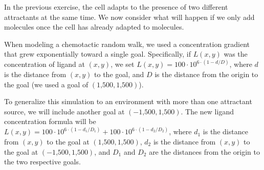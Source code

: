 \begin{exercise}\end{exercise}

In the previous exercise, the cell adapts to the presence of two different attractants at the same time. We now consider what will happen if we only add  molecules once the cell has already adapted to  molecules.\\

\begin{exercise}\end{exercise}

When modeling a chemotactic random walk, we used a concentration gradient that grew exponentially toward a single goal. Specifically, if $L(x,y)$ was the concentration of ligand at $(x, y)$, we set $L(x,y) = 100 \cdot 10^{6 \cdot (1-d/D)}$, where $d$ is the distance from $(x,y)$ to the goal, and $D$ is the distance from the origin to the goal (we used a goal of $(\text{1,500}, \text{1,500})$).

To generalize this simulation to an environment with more than one attractant source, we will include another goal at $(-\text{1,500}, \text{1,500})$. The new ligand concentration formula will be $L(x, y) = 100 \cdot 10^{6 \cdot (1-d_1/D_1)} + 100 \cdot 10^{6 \cdot (1-d_2/D_2)}$, where $d_1$ is the distance from $(x, y)$ to the goal at $(\text{1,500}, \text{1,500})$, $d_2$ is the distance from $(x, y)$ to the goal at $(-\text{1,500}, \text{1,500})$, and $D_1$ and $D_2$ are the distances from the origin to the two respective goals.\\

\begin{exercise}\end{exercise}

